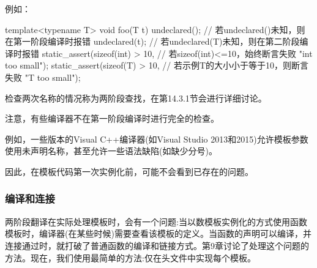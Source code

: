 例如：

\begin{cpp}
template<typename T>
void foo(T t)
{
	undeclared(); // 若undeclared()未知，则在第一阶段编译时报错
	undeclared(t); // 若undeclared(T)未知，则在第二阶段编译时报错
	static_assert(sizeof(int) > 10, // 若sizeof(int)<=10，始终断言失败
				  "int too small");
	static_assert(sizeof(T) > 10, // 若示例T的大小小于等于10，则断言失败
	              "T too small");
}
\end{cpp}

检查两次名称的情况称为两阶段查找，在第14.3.1节会进行详细讨论。

注意，有些编译器不在第一阶段编译时进行完全的检查。

\begin{notice}例如，一些版本的Visual C++编译器(如Visual Studio 2013和2015)允许模板参数使用未声明名称，甚至允许一些语法缺陷(如缺少分号)。
\end{notice}

因此，在模板代码第一次实例化前，可能不会看到已存在的问题。

\subsubsection{编译和连接}

两阶段翻译在实际处理模板时，会有一个问题:当以数模板实例化的方式使用函数模板时，编译器(在某些时候)需要查看该模板的定义。当函数的声明可以编译，并连接通过时，就打破了普通函数的编译和链接方式。第9章讨论了处理这个问题的方法。现在，我们使用最简单的方法:仅在头文件中实现每个模板。








